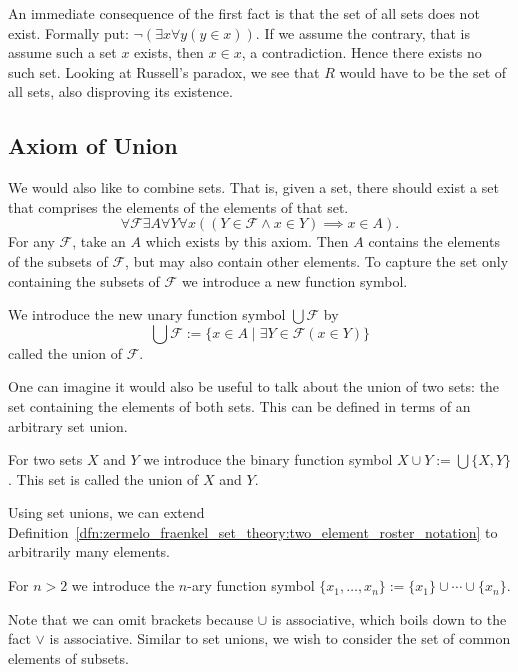 \documentclass[../main.tex]{subfiles}
\begin{document}
An immediate consequence of the first fact is that the set of all sets does not exist. Formally put: $\lnot(\exists x\forall y(y\in x))$. If we assume the contrary, that is assume such a set $x$ exists, then $x\in x$, a contradiction. Hence there exists no such set. Looking at Russell's paradox, we see that $R$ would have to be the set of all sets, also disproving its existence.

\subsection*{Axiom of Union}\label{subsec:zermelo_fraenkel_set_theory:axiom_of_union}
We would also like to combine sets. That is, given a set, there should exist a set that comprises the elements of the elements of that set.
\begin{equation*}
\forall\mathcal{F}\exists A\forall Y\forall x((Y\in\mathcal{F}\land x\in Y)\implies x\in A).
\end{equation*}
For any $\mathcal{F}$, take an $A$ which exists by this axiom. Then $A$ contains the elements of the subsets of $\mathcal{F}$, but may also contain other elements. To capture the set only containing the subsets of $\mathcal{F}$ we introduce a new function symbol.
\begin{definition}
    We introduce the new unary function symbol $\bigcup\mathcal{F}$ by
    \begin{equation*}
        \bigcup\mathcal{F}:=\{x\in A\mid\exists Y\in\mathcal{F}(x\in Y)\}
    \end{equation*}
    called the union of $\mathcal{F}$.
\end{definition}
One can imagine it would also be useful to talk about the union of two sets: the set containing the elements of both sets. This can be defined in terms of an arbitrary set union.
\begin{definition}
    For two sets $X$ and $Y$ we introduce the binary function symbol $X\cup Y:=\bigcup\{X,Y\}$. This set is called the union of $X$ and $Y$.
\end{definition}
Using set unions, we can extend Definition~\ref{dfn:zermelo_fraenkel_set_theory:two_element_roster_notation} to arbitrarily many elements.
\begin{definition}
    For $n>2$ we introduce the $n$-ary function symbol $\{x_1,\dots,x_n\}:=\{x_1\}\cup\cdots\cup\{x_n\}$.
\end{definition}
Note that we can omit brackets because $\cup$ is associative, which boils down to the fact $\lor$ is associative. Similar to set unions, we wish to consider the set of common elements of subsets.
\end{document}
